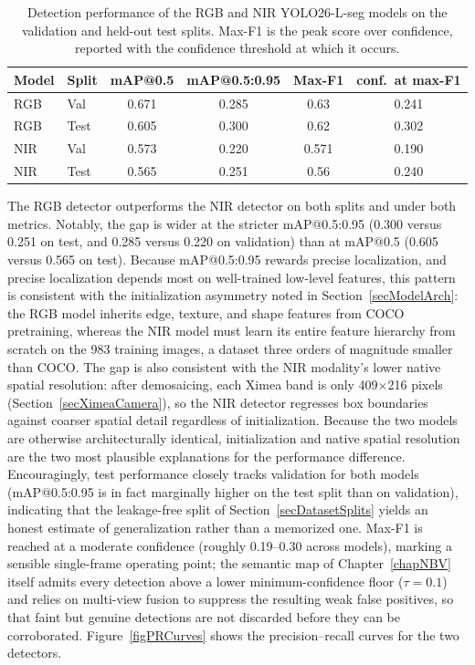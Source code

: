\begin{table}[h]
    \centering
    \caption{Detection performance of the RGB and NIR YOLO26-L-seg models
             on the validation and held-out test splits. Max-F1 is the
             peak score over confidence, reported with the confidence
             threshold at which it occurs.}
    \label{tabDetectionResults}
    \begin{tabular}{ll|cccc}
        \hline
        Model & Split & mAP@0.5 & mAP@0.5:0.95 & Max-F1 & conf.\ at max-F1 \\
        \hline
        RGB & Val  & 0.671 & 0.285 & 0.63 & 0.241 \\
        RGB & Test & 0.605 & 0.300 & 0.62 & 0.302 \\
        NIR & Val  & 0.573 & 0.220 & 0.571 & 0.190 \\
        NIR & Test & 0.565 & 0.251 & 0.56 & 0.240 \\
        \hline
    \end{tabular}
\end{table}

The RGB detector outperforms the NIR detector on both splits and under
both metrics.
Notably, the gap is wider at the stricter mAP@0.5:0.95 (0.300 versus
0.251 on test, and 0.285 versus 0.220 on validation) than at mAP@0.5
(0.605 versus 0.565 on test).
Because mAP@0.5:0.95 rewards precise localization, and precise
localization depends most on well-trained low-level features, this
pattern is consistent with the initialization asymmetry noted in
Section~\ref{secModelArch}: the RGB model inherits edge, texture, and
shape features from COCO pretraining, whereas the NIR model must learn
its entire feature hierarchy from scratch on the 983 training images, a
dataset three orders of magnitude smaller than COCO.
The gap is also consistent with the NIR modality's lower native spatial
resolution: after demosaicing, each Ximea band is only
409$\times$216 pixels (Section~\ref{secXimeaCamera}), so the NIR
detector regresses box boundaries against coarser spatial detail
regardless of initialization.
Because the two models are otherwise architecturally identical,
initialization and native spatial resolution are the two most plausible
explanations for the performance difference.
Encouragingly, test performance closely tracks validation for both
models (mAP@0.5:0.95 is in fact marginally higher on the test split
than on validation), indicating that the leakage-free split of
Section~\ref{secDatasetSplits} yields an honest estimate of
generalization rather than a memorized one.
Max-F1 is reached at a moderate confidence (roughly 0.19--0.30 across
models), marking a sensible single-frame operating point; the semantic map
of Chapter~\ref{chapNBV} itself admits every detection above a lower
minimum-confidence floor ($\tau = 0.1$) and relies on multi-view fusion to
suppress the resulting weak false positives, so that faint but genuine
detections are not discarded before they can be corroborated.
Figure~\ref{figPRCurves} shows the precision--recall curves for the two
detectors.

